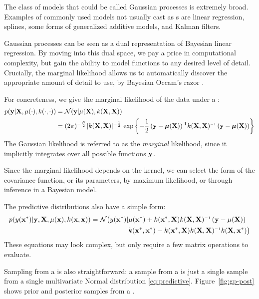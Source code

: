 The class of models that could be called Gaussian processes is extremely broad.
Examples of commonly used models not usually cast as \gp{}s are linear regression, splines, some forms of generalized additive models, and Kalman filters.

Gaussian processes can be seen as a dual representation of Bayesian linear regression. 
By moving into this dual space, we pay a price in computational complexity, but gain the ability to model functions to any desired level of detail.
Crucially, the marginal likelihood allows us to automatically discover the appropriate amount of detail to use, by Bayesian Occam's razor \citep{rasmussen2001occam,mackay2003information}.

For concreteness, we give the marginal likelihood of the data under a \gp{}:
%
\begin{align}
p(\vy | \vX, \mu(\cdot), k(\cdot, \cdot)) & = \N{\vy}{\mu(\vX)}{k(\vX, \vX)} \nonumber\\
& = (2\pi)^{-\frac{N}{2}}|k(\vX, \vX)|^{-\frac{1}{2}}\, \exp \left\{ -\frac{1}{2} \left( \vy - \boldsymbol\mu(\vX) \right)\tra k(\vX, \vX)\inv \left(\vy - \boldsymbol\mu(\vX) \right) \right\}
\label{eq:gp_marg_lik}
\end{align}
%
The Gaussian likelihood is referred to as the \emph{marginal} likelihood, since it implicitly integrates over all possible functions ${\bf{y}}$.

Since the marginal likelihood depends on the kernel, we can select the form of the covariance function, or its parameters, by maximum likelihood, or through inference in a Bayesian model.

The predictive distributions also have a simple form:
%
\begin{align}
p( y(\iva^*) | \vy, \vX, \mu(\iva), k(\iva, \iva)) 
= \mathcal{N} \big( y(\iva^*) | & \mu(\iva^*) + k(\iva^*, \vX) k(\vX, \vX)\inv \left( \vy - \mu(\vX) \right)  \nonumber \\
& k(\iva^*, \iva^*) - k(\iva^*, \vX) k(\vX, \vX)\inv k(\vX, \iva^*) \big)
\label{eq:predictive}
\end{align}
%
These equations may look complex, but only require a few matrix operations to evaluate.

Sampling from a \gp{} is also straightforward: a sample from a \gp{} is just a single sample from a single multivariate Normal distribution \eqref{eq:predictive}.
Figure~\ref{fig:gp-post} shows prior and posterior samples from a \gp{}.



